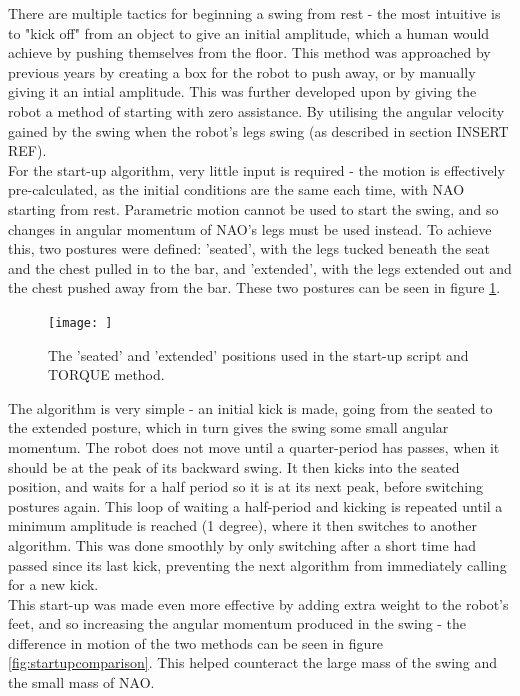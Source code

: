 \documentclass[11pt]{article}
\begin{document}
There are multiple tactics for beginning a swing from rest - the most intuitive is to "kick off" from an object to give an initial amplitude, which a human would achieve by pushing themselves from the floor. This method was approached by previous years by creating a box for the robot to push away, or by manually giving it an intial amplitude. This was further developed upon by giving the robot a method of starting with zero assistance. By utilising the angular velocity gained by the swing when the robot's legs swing (as described in section INSERT REF). \\

For the start-up algorithm, very little input is required - the motion is effectively pre-calculated, as the initial conditions are the same each time, with NAO starting from rest. Parametric motion cannot be used to start the swing, and so changes in angular momentum of NAO's legs must be used instead. To achieve this, two postures were defined: 'seated', with the legs tucked beneath the seat and the chest pulled in to the bar, and 'extended', with the legs extended out and the chest pushed away from the bar. These two postures can be seen in figure \ref{fig:seatedextended}.\\

    \begin{figure}
        \centering
        \texttt{[image: ]}
        \caption{The 'seated' and 'extended' positions used in the start-up script and TORQUE method.}
        \label{fig:seatedextended}
    \end{figure}

The algorithm is very simple - an initial kick is made, going from the seated to the extended posture, which in turn gives the swing some small angular momentum. The robot does not move until a quarter-period has passes, when it should be at the peak of its backward swing. It then kicks into the seated position, and waits for a half period so it is at its next peak, before switching postures again. This loop of waiting a half-period and kicking is repeated until a minimum amplitude is reached (1 degree), where it then switches to another algorithm. This was done smoothly by only switching after a short time had passed since its last kick, preventing the next algorithm from immediately calling for a new kick.\\

This start-up was made even more effective by adding extra weight to the robot's feet, and so increasing the angular momentum produced in the swing - the difference in motion of the two methods can be seen in figure \ref{fig:startupcomparison}. This helped counteract the large mass of the swing and the small mass of NAO.
\end{document}
